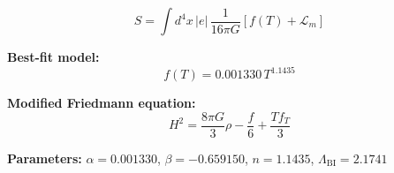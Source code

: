 
\begin{equation}
  S = \int d^4x \, |e| \, \frac{1}{16\pi G} \left[ f(T) + \mathcal{L}_m \right]
\end{equation}

\textbf{Best-fit model:}
\begin{equation}
  f(T) = 0.001330 \, T^{1.1435}
\end{equation}

\textbf{Modified Friedmann equation:}
\begin{equation}
  H^2 = \frac{8\pi G}{3} \rho - \frac{f}{6} + \frac{T f_T}{3}
\end{equation}

\textbf{Parameters:}
$\alpha = 0.001330$, \quad
$\beta = -0.659150$, \quad
$n = 1.1435$, \quad
$\Lambda_{\text{BI}} = 2.1741$